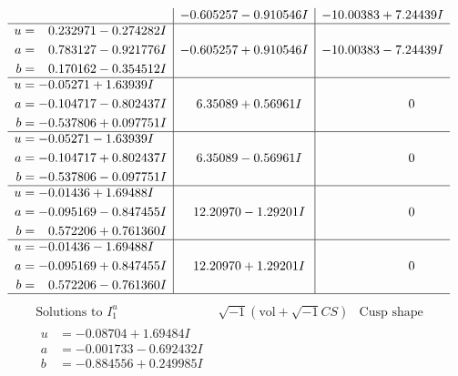 \documentclass[1p]{elsarticle_modified}
\theoremstyle{definition}
\newcommand{\I}{\sqrt{-1}}
\begin{document}
$$\begin{array}{c|c|c}
 & -0.605257 - 0.910546 I & -10.00383 + 7.24439 I \\ \hline\begin{aligned}
u &= \phantom{-}0.232971 - 0.274282 I \\
a &= \phantom{-}0.783127 - 0.921776 I \\
b &= \phantom{-}0.170162 - 0.354512 I\end{aligned}
 & -0.605257 + 0.910546 I & -10.00383 - 7.24439 I \\ \hline\begin{aligned}
u &= -0.05271 + 1.63939 I \\
a &= -0.104717 - 0.802437 I \\
b &= -0.537806 + 0.097751 I\end{aligned}
 & \phantom{-}6.35089 + 0.56961 I & \phantom{-0.000000 } 0 \\ \hline\begin{aligned}
u &= -0.05271 - 1.63939 I \\
a &= -0.104717 + 0.802437 I \\
b &= -0.537806 - 0.097751 I\end{aligned}
 & \phantom{-}6.35089 - 0.56961 I & \phantom{-0.000000 } 0 \\ \hline\begin{aligned}
u &= -0.01436 + 1.69488 I \\
a &= -0.095169 - 0.847455 I \\
b &= \phantom{-}0.572206 + 0.761360 I\end{aligned}
 & \phantom{-}12.20970 - 1.29201 I & \phantom{-0.000000 } 0 \\ \hline\begin{aligned}
u &= -0.01436 - 1.69488 I \\
a &= -0.095169 + 0.847455 I \\
b &= \phantom{-}0.572206 - 0.761360 I\end{aligned}
 & \phantom{-}12.20970 + 1.29201 I & \phantom{-0.000000 } 0\\
 \hline 
 \end{array}$$\newpage$$\begin{array}{c|c|c}  
\text{Solutions to }I^u_{1}& \I (\text{vol} + \sqrt{-1}CS) & \text{Cusp shape}\\
 \hline 
\begin{aligned}
u &= -0.08704 + 1.69484 I \\
a &= -0.001733 - 0.692432 I \\
b &= -0.884556 + 0.249985 I\end{aligned}

\end{array}$$
\end{document}
